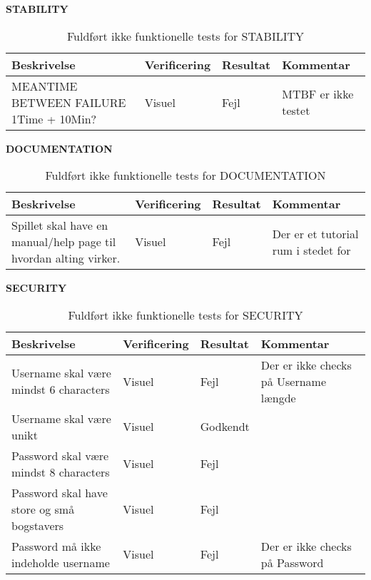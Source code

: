 \textbf{STABILITY}
\begin{table}[H]
\caption{ Fuldført ikke funktionelle tests for STABILITY}
\label{tab:}
\begin{tabular}{|p{3cm}|p{3cm}|p{3cm}|p{3cm}|}
\hline
Beskrivelse & Verificering & Resultat & Kommentar \\
\hline
 MEANTIME BETWEEN FAILURE 1Time + 10Min? & Visuel & Fejl & MTBF er ikke testet \\
\hline
\end{tabular}
\end{table}

\textbf{DOCUMENTATION}
\begin{table}[H]
\caption{ Fuldført ikke funktionelle tests for DOCUMENTATION}
\label{tab:}
\begin{tabular}{|p{3cm}|p{3cm}|p{3cm}|p{3cm}|}
\hline
Beskrivelse & Verificering & Resultat & Kommentar \\
\hline
Spillet skal have en manual/help page til hvordan alting virker. & Visuel & Fejl & Der er et tutorial rum i stedet for \\
\hline
\end{tabular}
\end{table}

\textbf{SECURITY}
\begin{table}[H]
\caption{ Fuldført ikke funktionelle tests for SECURITY}
\label{tab:}
\begin{tabular}{|p{3cm}|p{3cm}|p{3cm}|p{3cm}|}
\hline
Beskrivelse & Verificering & Resultat & Kommentar \\
\hline
 Username skal være mindst 6 characters & Visuel & Fejl & Der er ikke checks på Username længde\\
\hline
 Username skal være unikt & Visuel & Godkendt & \\
\hline
 Password skal være mindst 8 characters & Visuel & Fejl & \\
\hline
 Password skal have store og små bogstavers & Visuel & Fejl & \\
\hline
 Password må ikke indeholde username & Visuel & Fejl & Der er ikke checks på Password \\
\hline
\end{tabular}
\end{table}